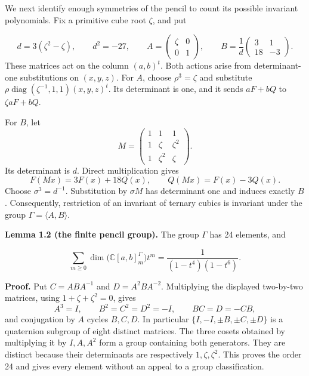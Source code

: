 \documentclass[
]{article}
\begin{document}
We next identify enough symmetries of the pencil to count its possible
invariant polynomials. Fix a primitive cube root \(\zeta\), and put
\protect{}\label{equation-A3}{}

\[
d=3(\zeta^2-\zeta),\qquad d^2=-27,
\qquad
A=\begin{pmatrix}\zeta&0\\0&1\end{pmatrix},\qquad
B=\frac1d\begin{pmatrix}3&1\\18&-3\end{pmatrix}.
\tag{A3}
\] These matrices act on the column \((a,b)^t\). Both actions arise from
determinant-one substitutions on \((x,y,z)\). For \(A\), choose
\(\rho^3=\zeta\) and substitute
\(\rho\operatorname{diag}(\zeta^{-1},1,1)(x,y,z)^t\). Its determinant is
one, and it sends \(aF+bQ\) to \(\zeta aF+bQ\).

For \(B\), let \[
M=\begin{pmatrix}
1&1&1\\1&\zeta&\zeta^2\\1&\zeta^2&\zeta
\end{pmatrix}.
\] Its determinant is \(d\). Direct multiplication gives \[
F(Mx)=3F(x)+18Q(x),\qquad Q(Mx)=F(x)-3Q(x).
\] Choose \(\sigma^3=d^{-1}\). Substitution by \(\sigma M\) has
determinant one and induces exactly \(B\). Consequently, restriction of
an invariant of ternary cubics is invariant under the group
\(\Gamma=\langle A,B\rangle\).

\protect{}\label{lemma-1-2}{}

\textbf{Lemma 1.2 (the finite pencil group).} The group \(\Gamma\) has
24 elements, and \protect{}\label{equation-A4}{}

\[
\sum_{m\geq0}\dim\bigl(\mathbb C [a,b]^\Gamma_m\bigr)t^m
=\frac1{(1-t^4)(1-t^6)}.
\tag{A4}
\]

\textbf{Proof.} Put \(C=ABA^{-1}\) and \(D=A^2BA^{-2}\). Multiplying the
displayed two-by-two matrices, using \(1+\zeta+\zeta^2=0\), gives \[
A^3=I,\qquad B^2=C^2=D^2=-I,\qquad
BC=D=-CB,
\] and conjugation by \(A\) cycles \(B,C,D\). In particular
\(\{I,-I,\pm B,\pm C,\pm D\}\) is a quaternion subgroup of eight
distinct matrices. The three cosets obtained by multiplying it by
\(I,A,A^2\) form a group containing both generators. They are distinct
because their determinants are respectively \(1,\zeta,\zeta^2\). This
proves the order 24 and gives every element without an appeal to a group
classification.
\end{document}
